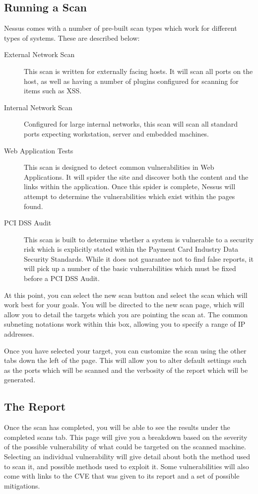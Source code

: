 		\subsection{Running a Scan}
			Nessus comes with a number of pre-built scan types which work for different types of systems. 
			These are described below:
			\begin{description}
				\item[External Network Scan] This scan is written for externally facing hosts. 
					It will scan all ports on the host, as well as having a number of plugins configured for scanning for items such as XSS. 
				\item[Internal Network Scan]
					Configured for large internal networks, this scan will scan all standard ports expecting workstation, server and embedded machines. 
				\item[Web Application Tests]
					This scan is designed to detect common vulnerabilities in Web Applications. 
					It will spider the site and discover both the content and the links within the application. 
					Once this spider is complete, Nessus will attempt to determine the vulnerabilities which exist within the pages found. 
				\item[PCI DSS Audit]
					This scan is built to determine whether a system is vulnerable to a security risk which is explicitly stated within the Payment Card Industry Data Security Standards. 
					While it does not guarantee not to find false reports, it will pick up a number of the basic vulnerabilities which must be fixed before a PCI DSS Audit. 
			\end{description}
			At this point, you can select the new scan button and select the scan which will work best for your goals. 
			You will be directed to the new scan page, which will allow you to detail the targets which you are pointing the scan at. 
			The common subneting notations work within this box, allowing you to specify a range of IP addresses. 

			Once you have selected your target, you can customize the scan using the other tabs down the left of the page. 
			This will allow you to alter default settings such as the ports which will be scanned and the verbosity of the report which will be generated. 
		\subsection{The Report}
			Once the scan has completed, you will be able to see the results under the completed scans tab. 
			This page will give you a breakdown based on the severity of the possible vulnerability of what could be targeted on the scanned machine. 
			Selecting an individual vulnerability will give detail about both the method used to scan it, and possible methods used to exploit it. 
			Some vulnerabilities will also come with links to the CVE that was given to its report and a set of possible mitigations. 

